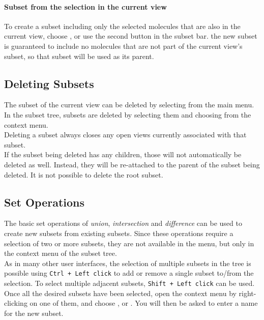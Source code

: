 \paragraph{Subset from the selection in the current view}
To create a subset including only the selected molecules that are also in the current view, choose , or use the second  button in the subset bar.
the new subset is guaranteed to include no molecules that are not part of the current view's subset, so that subset will be used as its parent.


\subsection{Deleting Subsets}

The subset of the current view can be deleted by selecting  from the main menu.
In the subset tree, subsets are deleted by selecting them and choosing  from the context menu.
\\
Deleting a subset always closes any open views currently associated with that subset.
\\
If the subset being deleted has any children, those will not automatically be deleted as well.
Instead, they will be re-attached to the parent of the subset being deleted.
It is not possible to delete the root subset.


\subsection{Set Operations}

The basic set operations of \emph{union}, \emph{intersection} and \emph{difference} can be used to create new subsets from existing subsets.
Since these operations require a selection of two or more subsets, they are not available in the  menu, but only in the context menu of the subset tree.
\\
As in many other user interfaces, the selection of multiple subsets in the tree is possible using \texttt{Ctrl + Left click} to add or remove a single subset to/from the selection.
To select multiple adjacent subsets, \texttt{Shift + Left click} can be used.
Once all the desired subsets have been selected, open the context menu by right-clicking on one of them, and choose ,  or .
You will then be asked to enter a name for the new subset.

